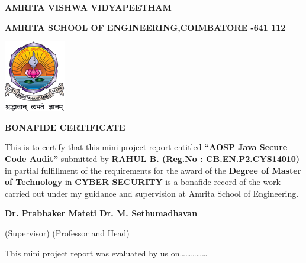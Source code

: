 
\clearpage

  \begin{center}
\Large
\textbf{AMRITA VISHWA VIDYAPEETHAM}

\normalsize
\textbf{AMRITA SCHOOL OF ENGINEERING,COIMBATORE -641 112}

\vspace*{22pt}
\includegraphics[keepaspectratio=true]{WSU/avvp_logo.png}

\vspace*{22pt}
\normalsize
\textbf{BONAFIDE CERTIFICATE}

\end{center}

\begin{sloppypar}
\noindent
This is to certify that this mini project report entitled \textbf{``AOSP Java Secure Code Audit''} submitted by \textbf{RAHUL B. (Reg.No : CB.EN.P2.CYS14010)} in partial fulfillment of the requirements for the award of the \textbf{Degree of Master of Technology} in \textbf{CYBER SECURITY} is a bonafide record of the work carried out under my guidance and supervision at Amrita School of Engineering.
\end{sloppypar}


\vspace*{52pt}
\begin{flushleft}
\noindent
\textbf{Dr. Prabhaker Mateti \hspace*{142Pt}Dr. M. Sethumadhavan}

\vspace*{5pt}
\noindent
(Supervisor)
\hspace*{224pt}
(Professor and Head)
\end{flushleft}



\vspace*{20pt}
\begin{flushleft}
\noindent
This mini project report was evaluated by us on\ldots\ldots\ldots\ldots\ldots
\end{flushleft}

